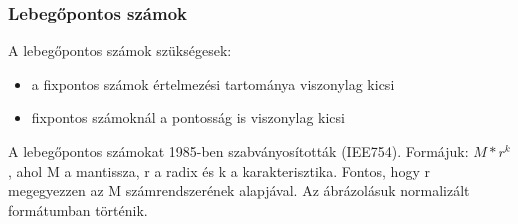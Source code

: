 \subsubsection{Lebegőpontos számok}
A lebegőpontos számok szükségesek:
\begin{itemize}
    \item a fixpontos számok értelmezési tartománya viszonylag kicsi
    \item fixpontos számoknál a pontosság is viszonylag kicsi
\end{itemize}

A lebegőpontos számokat 1985-ben szabványosították (IEE754).
Formájuk: $M*r^k$, ahol M a mantissza, r a radix és k a karakterisztika.
Fontos, hogy r megegyezzen az M számrendszerének alapjával.
Az ábrázolásuk normalizált formátumban történik.